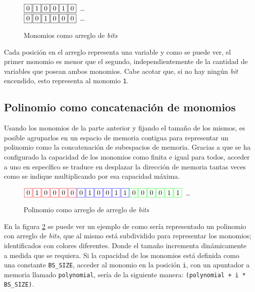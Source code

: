 \begin{figure}[!ht]
    \centering\noindent
    $\fbox{0} \hspace*{.1em} \fbox{1} \hspace*{.1em} \fbox{0} \hspace*{.1em} \fbox{0} \hspace*{.1em} \fbox{1} \hspace*{.1em} \fbox{0}$\ \dots\ \\
    \noindent
    $\fbox{0} \hspace*{.1em} \fbox{0} \hspace*{.1em} \fbox{1} \hspace*{.1em} \fbox{0} \hspace*{.1em} \fbox{0} \hspace*{.1em} \fbox{0}$\ \dots\
\caption{Monomios como arreglo de \textit{bits}}
\label{fig:mbs}
\end{figure}

Cada posición en el arreglo representa una variable y como se puede ver, el primer monomio es menor que el segundo, independientemente de la cantidad de variables que posean ambos monomios. Cabe acotar que, si no hay ningún \textit{bit} encendido, esto representa al monomio \texttt{1}.

\subsection{Polinomio como concatenación de monomios}

Usando los monomios de la parte anterior y fijando el tamaño de los mismos, es posible agruparlos en un espacio de memoria contigua para representar un polinomio como la concatenación de subespacios de memoria. Gracias a que se ha configurado la capacidad de los monomios como finita e igual para todos, acceder a uno en específico se traduce en desplazar la dirección de memoria tantas veces como se indique multiplicando por esa capacidad máxima.

\begin{figure}[!ht]
    \centering\noindent
    $\fcolorbox{red}{white}{0} \sep \fcolorbox{red}{white}{1} \sep \fcolorbox{red}{white}{0} \sep \fcolorbox{red}{white}{0} \sep \fcolorbox{red}{white}{0} \sep \fcolorbox{red}{white}{0} \sep \fcolorbox{blue}{white}{0} \sep \fcolorbox{blue}{white}{1} \sep \fcolorbox{blue}{white}{0} \sep \fcolorbox{blue}{white}{0} \sep \fcolorbox{blue}{white}{1} \sep \fcolorbox{blue}{white}{1} \sep \fcolorbox{green}{white}{0} \sep \fcolorbox{green}{white}{0} \sep \fcolorbox{green}{white}{0} \sep \fcolorbox{green}{white}{0} \sep \fcolorbox{green}{white}{1} \sep \fcolorbox{green}{white}{1}$\ \dots\ \\
\caption{Polinomio como arreglo de arreglo de \textit{bits}}
\label{fig:pbs}
\end{figure}

En la figura \ref{fig:pbs} se puede ver un ejemplo de como sería representado un polinomio con arreglo de \textit{bits}, que al mismo está subdividido para representar los monomios; identificados con colores diferentes. Donde el tamaño incrementa dinámicamente a medida que se requiera. Si la capacidad de los monomios está definida como una constante \texttt{BS\_SIZE}, acceder al monomio en la posición \texttt{i}, con un apuntador a memoria llamado \texttt{polynomial}, sería de la siguiente manera: \texttt{(polynomial + i * BS\_SIZE)}.

